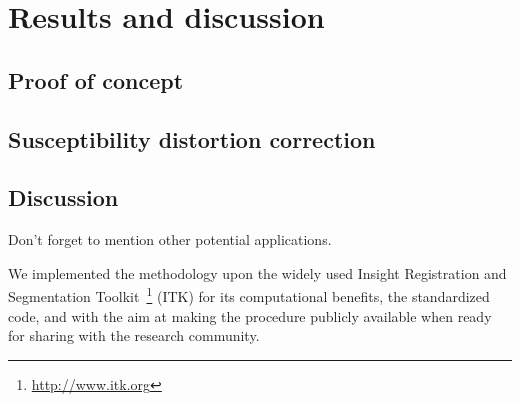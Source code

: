 \section{Results and discussion}
\label{sec:results}

\subsection{Proof of concept}
\label{sec:results_phantom}

\subsection{Susceptibility distortion correction}
\label{sec:results_phantom}

\subsection{Discussion}
\label{sec:discussion}
Don't forget to mention other potential applications.



We implemented the methodology upon the widely used
Insight Registration and Segmentation
Toolkit~\footnote{\url{http://www.itk.org}} (ITK)
for its computational benefits, the standardized code, and
with the aim at making the procedure publicly available
when ready for sharing with the research community.
